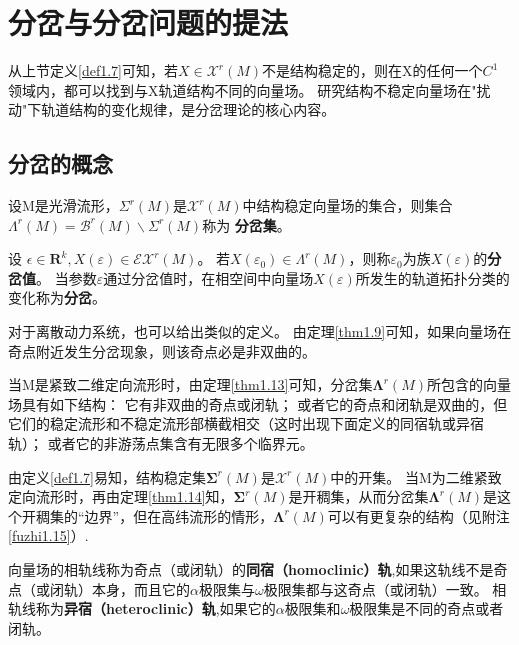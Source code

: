 \section{分岔与分岔问题的提法}

从上节定义\ref{def1.7}可知，若\(X\in \mathscr{X}^r(M)\)不是结构稳定的，则在X的任何一个\(C^1\)领域内，都可以找到与X轨道结构不同的向量场。
研究结构不稳定向量场在"扰动"下轨道结构的变化规律，是分岔理论的核心内容。

\subsection{分岔的概念}

\begin{defination}
设M是光滑流形，\(\Sigma^r(M)\)是\(\mathscr{X}^r(M)\)中结构稳定向量场的集合，则集合$\Lambda ^ { r } ( M ) = \mathscr { B } ^ { r } ( M ) \backslash \Sigma ^ { r } ( M )$称为 \textbf{分岔集}。
\end{defination}

\begin{defination}设
  $\epsilon \in \mathbf { R } ^ { k } , X ( \varepsilon ) \in \mathscr { E } \mathscr { X } ^ { r } ( M )$。
  若$X \left( \varepsilon _ { 0 } \right) \in \Lambda ^ { r } ( M )$，则称\(\varepsilon_0\)为族\(X(\varepsilon)\)的\textbf{分岔值}。
  当参数\(\varepsilon\)通过分岔值时，在相空间中向量场$X ( \varepsilon )$所发生的轨道拓扑分类的变化称为\textbf{分岔}。
\end{defination}
对于离散动力系统，也可以给出类似的定义。
由定理\ref{thm1.9}可知，如果向量场在奇点附近发生分岔现象，则该奇点必是非双曲的。


当M是紧致二维定向流形时，由定理\ref{thm1.13}可知，分岔集$\boldsymbol { \Lambda} ^r( M )$所包含的向量场具有如下结构：
它有非双曲的奇点或闭轨；
或者它的奇点和闭轨是双曲的，但它们的稳定流形和不稳定流形部横截相交（这时出现下面定义的同宿轨或异宿轨）；
或者它的非游荡点集含有无限多个临界元。


由定义\ref{def1.7}易知，结构稳定集$\boldsymbol { \Sigma } ^ { r } ( M )$是$\mathscr{ X } ^ { r } ( M )$中的开集。
当M为二维紧致定向流形时，再由定理\ref{thm1.14}知，$\boldsymbol { \Sigma } ^ { r } ( M )$是开稠集，从而分岔集$\boldsymbol { \Lambda} ^r( M )$是这个开稠集的“边界”，但在高纬流形的情形，$\boldsymbol { \Lambda} ^r( M )$可以有更复杂的结构（见附注\ref{fuzhi1.15}）.

\begin{defination}
    \label{def1.2.3}
  向量场的相轨线称为奇点（或闭轨）的\textbf{同宿（homoclinic）轨},如果这轨线不是奇点（或闭轨）本身，而且它的\(\alpha\)极限集与\(\omega\)极限集都与这奇点（或闭轨）一致。
  相轨线称为\textbf{异宿（heteroclinic）轨},如果它的\(\alpha\)极限集和\(\omega\)极限集是不同的奇点或者闭轨。
\end{defination}


